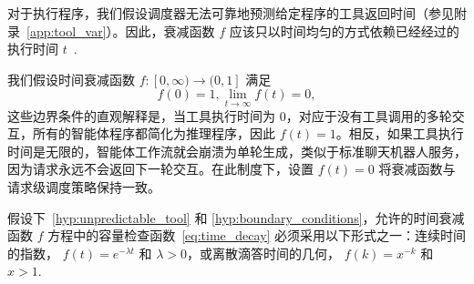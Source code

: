 \begin{hypothesis}
\label{hyp:unpredictable_tool}
对于执行程序，我们假设调度器无法可靠地预测给定程序的工具返回时间（参见附录~\ref{app:tool_var}）。因此，衰减函数 $f$ 应该只以时间均匀的方式依赖已经经过的执行时间 $t$~\cite{parzen1999stochastic}.
\end{hypothesis}


\begin{hypothesis}
\label{hyp:boundary_conditions}
我们假设时间衰减函数 $f:[0,\infty)\rightarrow(0,1]$ 满足
\begin{equation}
f(0) = 1, \lim_{t\to\infty} f(t) = 0,
\label{eq:boundary_f}
\end{equation}
这些边界条件的直观解释是，当工具执行时间为 $0$，对应于没有工具调用的多轮交互，所有的智能体程序都简化为推理程序，因此 $f(t)=1$。相反，如果工具执行时间是无限的，智能体工作流就会崩溃为单轮生成，类似于标准聊天机器人服务，因为请求永远不会返回下一轮交互。在此制度下，设置 $f(t)=0$ 将衰减函数与请求级调度策略保持一致。
\end{hypothesis}

\begin{theorem}
\label{thm:admissible_decay}
假设下~\ref{hyp:unpredictable_tool} 和 \ref{hyp:boundary_conditions}，允许的时间衰减函数 $f$ 方程中的容量检查函数~\ref{eq:time_decay} 必须采用以下形式之一：连续时间的指数， $f(t)=e^{-\lambda t}$ 和 $\lambda>0$，或离散滴答时间的几何， $f(k)=x^{-k}$ 和 $x>1$.
\end{theorem}

